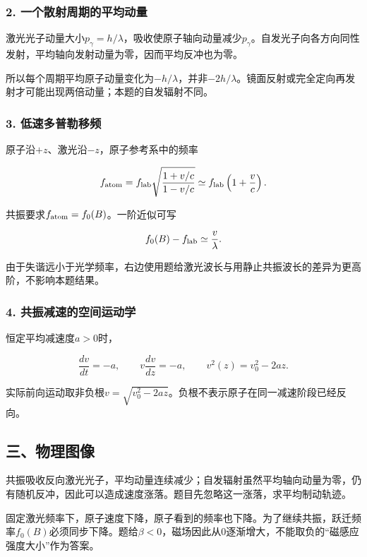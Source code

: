 \documentclass[12pt,a4paper,fontset=fandol]{ctexart}
\begin{document}
\subsubsection{2.
一个散射周期的平均动量}\label{ux4e00ux4e2aux6563ux5c04ux5468ux671fux7684ux5e73ux5747ux52a8ux91cf}

激光光子动量大小\(p_\gamma=h/\lambda\)，吸收使原子轴向动量减少\(p_\gamma\)。自发光子向各方向同性发射，平均轴向发射动量为零，因而平均反冲也为零。

所以每个周期平均原子动量变化为\(-h/\lambda\)，并非\(-2h/\lambda\)。镜面反射或完全定向再发射才可能出现两倍动量；本题的自发辐射不同。

\subsubsection{3.
低速多普勒移频}\label{ux4f4eux901fux591aux666eux52d2ux79fbux9891}

原子沿\(+z\)、激光沿\(-z\)，原子参考系中的频率

\[
f_{\rm atom}=f_{\rm lab}\sqrt{\frac{1+v/c}{1-v/c}}
\simeq f_{\rm lab}\left(1+\frac vc\right).
\]

共振要求\(f_{\rm atom}=f_0(B)\)。一阶近似可写

\[
f_0(B)-f_{\rm lab}\simeq\frac v\lambda.
\]

由于失谐远小于光学频率，右边使用题给激光波长与用静止共振波长的差异为更高阶，不影响本题结果。

\subsubsection{4.
共振减速的空间运动学}\label{ux5171ux632fux51cfux901fux7684ux7a7aux95f4ux8fd0ux52a8ux5b66}

恒定平均减速度\(a>0\)时，

\[
\frac{dv}{dt}=-a,\qquad
v\frac{dv}{dz}=-a,
\qquad v^2(z)=v_0^2-2az.
\]

实际前向运动取非负根\(v=\sqrt{v_0^2-2az}\)。负根不表示原子在同一减速阶段已经反向。

\subsection{三、物理图像}\label{ux4e09ux7269ux7406ux56feux50cf-4}

共振吸收反向激光光子，平均动量连续减少；自发辐射虽然平均轴向动量为零，仍有随机反冲，因此可以造成速度涨落。题目先忽略这一涨落，求平均制动轨迹。

固定激光频率下，原子速度下降，原子看到的频率也下降。为了继续共振，跃迁频率\(f_0(B)\)必须同步下降。题给\(\beta<0\)，磁场因此从0逐渐增大，不能取负的``磁感应强度大小''作为答案。
\end{document}
